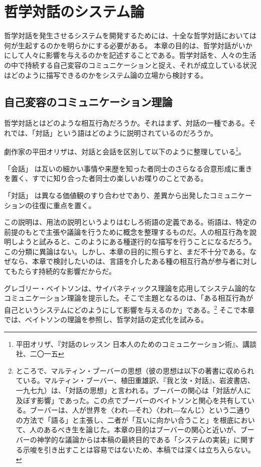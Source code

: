 \documentclass[9pt,b5j,twoside,twocolumn]{utarticle}
\begin{document}



\section{哲学対話のシステム論}
哲学対話を発生させるシステムを開発するためには、十全な哲学対話においては何が生起するのかを明らかにする必要がある。
本章の目的は、哲学対話がいかにして人々に影響を与えるのかを記述することである。哲学対話を、人々の生活の中で持続する自己変容のコミュニケーションと捉え、それが成立している状況はどのように描写できるのかをシステム論の立場から検討する。


\subsection{自己変容のコミュニケーション理論}
哲学対話とはどのような相互行為だろうか。それはまず、対話の一種である。それでは、「対話」という語はどのように説明されているのだろうか。


劇作家の平田オリザは、対話と会話を区別して以下のように整理している\footnote{平田オリザ、『対話のレッスン 日本人のためのコミュニケーション術』、講談社、二〇一五}。
\begin{description}
 \setlength{\itemsep}{-2mm} 
\item{「会話」} は互いの細かい事情や来歴を知った者同士のさらなる合意形成に重きを置く、すでに知り合った者同士の楽しいお喋りのことである。
\item{「対話」} は異なる価値観のすり合わせであり、差異から出発したコミュニケーションの往復に重点を置く。
\end{description}
この説明は、用法の説明というよりはむしろ術語の定義である。術語は、特定の前提のもとで主張や議論を行うために概念を整理するものだ。人の相互行為を說明しようと試みると、このようにある種遂行的な描写を行うことになるだろう。
この分類に異論はない。しかし、本章の目的に照らすと、まだ不十分である。なぜなら、本章で検討したいのは、言語を介したある種の相互行為が参与者に対してもたらす持続的な影響だからだ。


グレゴリー・ベイトソンは、サイバネティックス理論を応用してシステム論的なコミュニケーション理論を提示した。そこで主題となるのは、「ある相互行為が自己というシステムにどのようにして影響を与えるのか」である。\footnote{ところで、マルティン・ブーバーの思想（彼の思想は以下の著書に収められている。マルティン・ブーバー、植田重雄訳、『我と汝・対話』、岩波書店、一九七九）は、「対話の思想」と言われる。ブーバーの関心は「対話が人に及ぼす影響」であった。この点でブーバーのベイトソンと関心を共有している。ブーバーは、人が世界を〈われ―それ〉〈われ―なんじ〉という二通りの方法で「語る」と主張し、二者が「互いに向かい合うこと」を根底において、人のあるべき生を論じた。本章の目的はブーバーの関心と近いが、ブーバーの神学的な議論からは本稿の最終目的である「システムの実装」に関する示唆を引き出すことは容易ではないため、本稿では深くは立ち入らない。}
そこで本章では、ベイトソンの理論を参照し、哲学対話の定式化を試みる。
\end{document}

